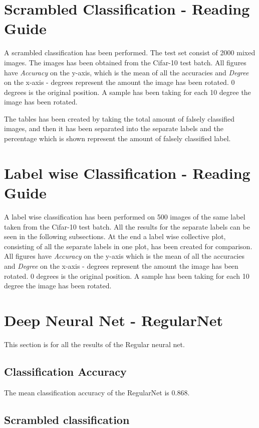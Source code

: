 \section{Scrambled Classification - Reading Guide}
A scrambled classification has been performed. The test set consist of 2000 mixed images. The images has been obtained from the Cifar-10 test batch.
All figures have \emph{Accuracy} on the y-axis, which is the mean of all the accuracies and \emph{Degree} on the x-axis - degrees represent the amount the image has been rotated. 0 degrees is the original position. A sample has been taking for each 10 degree the image has been rotated.

The tables has been created by taking the total amount of falsely classified images, and then it has been separated into the separate labels and the percentage which is shown represent the amount of falsely classified label.

\section{Label wise Classification - Reading Guide}
A label wise classification has been performed on 500 images of the same label taken from the Cifar-10 test batch. All the results for the separate labels can be seen in the following subsections. At the end a label wise collective plot, consisting of all the separate labels in one plot, has been created for comparison.
All figures have \emph{Accuracy} on the y-axis which is the mean of all the accuracies and \emph{Degree} on the x-axis - degrees represent the amount the image has been rotated. 0 degrees is the original position. A sample has been taking for each 10 degree the image has been rotated.
\newpage
\section{Deep Neural Net - RegularNet}
This section is for all the results of the Regular neural net.

\subsection{Classification Accuracy}
The mean classification accuracy of the RegularNet is 0.868.
\FloatBarrier
\subsection{Scrambled classification}
\FloatBarrier

